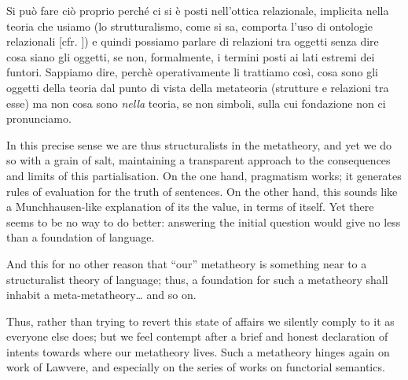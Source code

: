 Si può fare ciò proprio perché ci si è posti nell'ottica relazionale, implicita nella teoria che usiamo (lo strutturalismo, come si sa, comporta l'uso di ontologie relazionali [cfr. \cite{??}]) e quindi possiamo parlare di relazioni tra oggetti senza dire cosa siano gli oggetti, se non, formalmente, i termini posti ai lati estremi dei funtori. Sappiamo dire, perchè operativamente li trattiamo così, cosa sono gli oggetti della teoria dal punto di vista della metateoria (strutture e relazioni tra esse) ma non cosa sono \textit{nella} teoria, se non simboli, sulla cui fondazione non ci pronunciamo. 

In this precise sense we are thus structuralists in the metatheory, and yet we do so with a grain of salt, maintaining a transparent approach to the consequences and limits of this partialisation. On the one hand, pragmatism works; it generates rules of evaluation for the truth of sentences. On the other hand, this sounds like a Munchhausen-like explanation of its the value, in terms of itself. Yet there seems to be no way to do better: answering the initial question would give no less than a foundation of language.

And this for no other reason that ``our'' metatheory is something near to a structuralist theory of language; thus, a foundation for such a metatheory shall inhabit a meta-metatheory\dots{} and so on.

Thus, rather than trying to revert this state of affairs we silently comply to it as everyone else does; but we feel contempt after a brief and honest declaration of intents towards where our metatheory lives. Such a metatheory hinges again on work of Lawvere, and especially on the series of works on functorial semantics.
